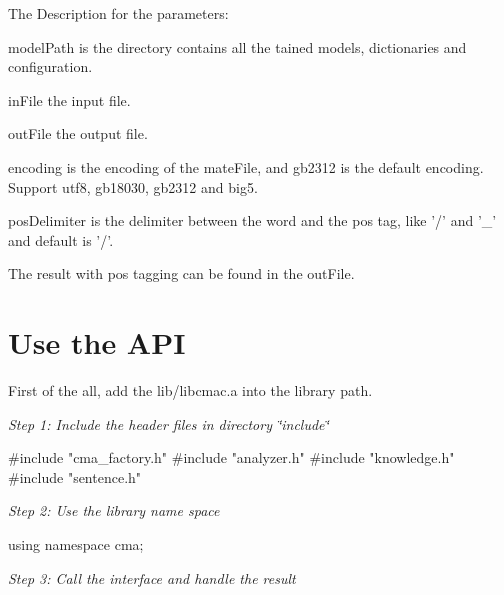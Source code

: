 \par
The Description for the parameters: 
\begin{DoxyItemize}
\item modelPath is the directory contains all the tained models, dictionaries and configuration.  
\item inFile the input file. 
\item outFile the output file. 
\item encoding is the encoding of the mateFile, and gb2312 is the default encoding. Support utf8, gb18030, gb2312 and big5. 
\item posDelimiter is the delimiter between the word and the pos tag, like '/' and '\_\-' and default is '/'. 
\end{DoxyItemize}

The result with pos tagging can be found in the outFile.\section{Use the API}\label{index_useapi}
First of the all, add the lib/libcmac.a into the library path.

{\itshape Step 1: Include the header files in directory \char`\"{}include\char`\"{}\/} 
\begin{DoxyCode}
#include "cma_factory.h"
#include "analyzer.h"
#include "knowledge.h"
#include "sentence.h"
\end{DoxyCode}


{\itshape Step 2: Use the library name space\/} 
\begin{DoxyCode}
using namespace cma;
\end{DoxyCode}


{\itshape Step 3: Call the interface and handle the result\/}


